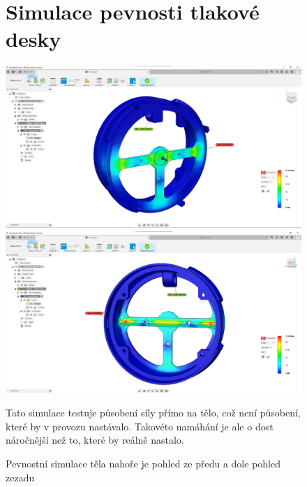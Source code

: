 \begin{figure}
\section{Simulace pevnosti tlakové desky}

    \centering
    \includegraphics[width=370pt]{kapitoly/obrazky/E4/machanika_tlakove_desky/simulace/F100N,primo,uprostred,pohled_zepredu.png}
    \includegraphics[width=370pt]{kapitoly/obrazky/E4/machanika_tlakove_desky/simulace/F100N,primo,uprostred,pohled_zezadu.png}
    \caption{Pevnostní simulace těla nahoře je pohled ze předu a dole pohled zezadu \centering}
    Tato simulace testuje působení síly přímo na tělo, což není působení, které by v provozu nastávalo. Takovéto namáhání je ale o dost náročnější
    než to, které by reálně nastalo.
    \label{fig:E4-simulace_tela} %
\end{figure}

